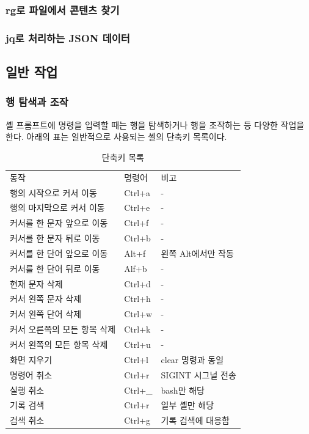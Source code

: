 \subsubsection*{rg로 파일에서 콘텐츠 찾기}

\subsubsection*{jq로 처리하는 JSON 데이터}


\subsection*{일반 작업}
\subsubsection*{행 탐색과 조작}
\begin{flushleft}
    셸 프롬프트에 명령을 입력할 때는 행을 탐색하거나 행을 조작하는 등 다양한 작업을 한다.
    아래의 표는 일반적으로 사용되는 셸의 단축키 목록이다.
\end{flushleft}


\begin{table}[H]
    \everyrow{\hline}
    \begin{tabu}{|X[7]|X[3]|X[5]|}
        동작 & 명령어 & 비고 \\
        행의 시작으로 커서 이동 & Ctrl+a & - \\
        행의 마지막으로 커서 이동 & Ctrl+e & - \\
        커서를 한 문자 앞으로 이동 & Ctrl+f & - \\
        커서를 한 문자 뒤로 이동 & Ctrl+b & - \\
        커서를 한 단어 앞으로 이동 & Alt+f & 왼쪽 Alt에서만 작동 \\
        커서를 한 단어 뒤로 이동 & Alf+b & - \\
        현재 문자 삭제 & Ctrl+d & - \\
        커서 왼쪽 문자 삭제 & Ctrl+h & - \\
        커서 왼쪽 단어 삭제 & Ctrl+w & - \\
        커서 오른쪽의 모든 항목 삭제 & Ctrl+k & - \\
        커서 왼쪽의 모든 항목 삭제 & Ctrl+u & - \\
        화면 지우기 & Ctrl+l & clear 명령과 동일 \\
        명령어 취소 & Ctrl+r & SIGINT 시그널 전송 \\
        실행 취소 & Ctrl+\_ & bash만 해당 \\
        기록 검색 & Ctrl+r & 일부 셸만 해당 \\
        검색 취소 & Ctrl+g & 기록 검색에 대응함 \\
    \end{tabu}
    \caption{단축키 목록}
\end{table}

